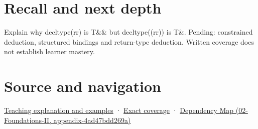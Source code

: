 \section{Recall and next depth}\label{appendix-5d4252a42886-recall-and-next-depth}

Explain why decltype(rr) is T\&\& but decltype((rr)) is T\&. Pending: constrained deduction, structured bindings and return-type deduction. Written coverage does not establish learner mastery.

\section{Source and navigation}\label{appendix-5d4252a42886-source-and-navigation}

\href{Continuous\%20Notes/Computing\%20Foundations\%20-\%20From\%20Bits\%20to\%20C++\%20and\%20Systems\%20APIs\#An\%20expression\%20has\%20a\%20type\%20and\%20a\%20category}{Teaching explanation and examples} · \hyperref[appendix-fd090d982a15-m008---parts-113-126]{Exact coverage} · \href{../02-Foundations-II/main.pdf\#nameddest=appendix-4ad47bdd269a}{Dependency Map (02-Foundations-II, appendix-4ad47bdd269a)}

